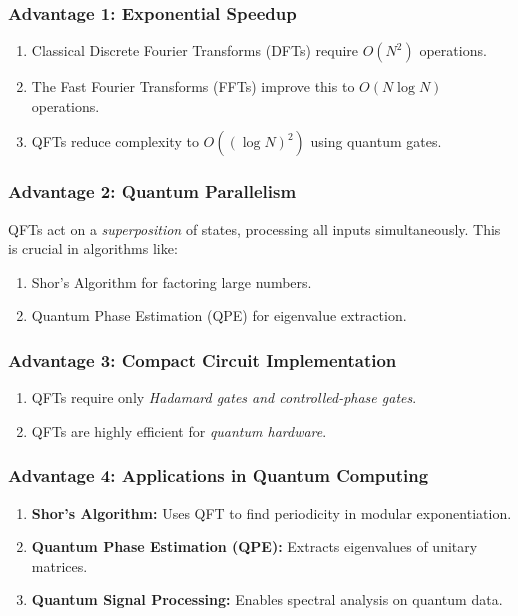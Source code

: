 \documentclass{beamer}
\begin{document}
\begin{frame}
\frametitle{Advantage 1: Exponential Speedup}

\begin{enumerate}
\item Classical Discrete Fourier Transforms (DFTs) require $O(N^2)$ operations.

\item The Fast Fourier Transforms (FFTs) improve this to $O(N \log N)$ operations.

\item QFTs reduce complexity to $O((\log N)^2)$ using quantum gates.
\end{enumerate}

\noindent
\end{frame}

\begin{frame}
\frametitle{Advantage 2: Quantum Parallelism}

QFTs act on a \emph{superposition} of states, processing all inputs simultaneously.
This is crucial in algorithms like:
\begin{enumerate}
\item Shor’s Algorithm for factoring large numbers.

\item Quantum Phase Estimation (QPE) for eigenvalue extraction.
\end{enumerate}

\noindent
\end{frame}

\begin{frame}
\frametitle{Advantage 3: Compact Circuit Implementation}

\begin{enumerate}
\item QFTs require only \emph{Hadamard gates and controlled-phase gates}.

\item QFTs are highly efficient for \emph{quantum hardware}.
\end{enumerate}

\noindent
\end{frame}

\begin{frame}
\frametitle{Advantage 4: Applications in Quantum Computing}

\begin{enumerate}
\item \textbf{Shor’s Algorithm:} Uses QFT to find periodicity in modular exponentiation.

\item \textbf{Quantum Phase Estimation (QPE):} Extracts eigenvalues of unitary matrices.

\item \textbf{Quantum Signal Processing:} Enables spectral analysis on quantum data.
\end{enumerate}

\noindent
\end{frame}
\end{document}
